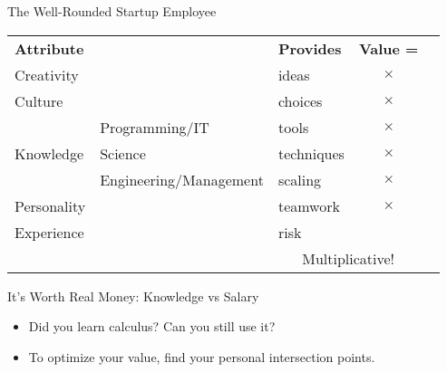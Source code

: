 \documentclass{beamer}
\begin{document}
\begin{frame}{The Well-Rounded Startup Employee}

\begin{centering}

\begin{tabular}{lllcl}
\textbf{Attribute}       &  &  \textbf{Provides}  & \textbf{Value =} & \vspace{0.5cm} \\

Creativity                 & &  ideas        & $\times$ & \\ 
Culture                    & &  choices      & $\times$ & \vspace{0.5cm} \\ 

& Programming/IT             &  tools        & $\times$ & \\
Knowledge & Science                    &  techniques   & $\times$ & \\
& Engineering/Management     &  scaling      & $\times$ & \vspace{0.5cm} \\ 

Personality                & & teamwork     & $\times$ & \\
Experience                 & & risk         & \vspace{0.5cm} \\
& & \multicolumn{2}{c}{\alert{Multiplicative!}}
\end{tabular}

\end{centering}

\end{frame}

\begin{frame}{It's Worth Real Money: Knowledge vs Salary}

  \begin{center}
  \end{center}

\begin{itemize}
\item Did you learn calculus?  Can you still use it?
\item To optimize your value, find your personal intersection points.
\end{itemize}

\end{frame}
\end{document}
